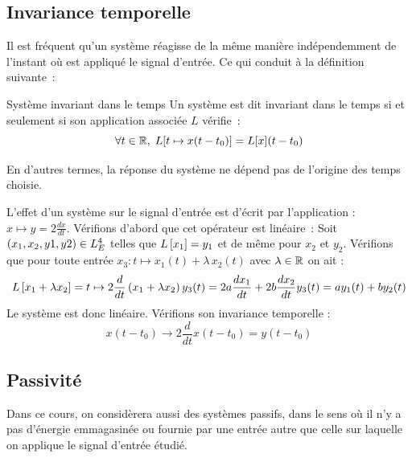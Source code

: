 	
	\subsection{Invariance temporelle}
	Il est fréquent qu'un système réagisse de la même manière indépendemment de l'instant où est appliqué le signal d'entrée. Ce qui conduit à la définition suivante~: 
	\begin{definition}{Système invariant dans le temps}
	Un système est dit invariant dans le temps si et seulement si son application associée $L$ vérifie~:
	\begin{equation}
	\forall t\in \mathbb{R}, \; L[t\mapsto x(t-t_{0})] = L[x](t-t_{0}) 
	\end{equation}
	\end{definition}
	
	En d'autres termes, la réponse du système ne dépend pas de l'origine des temps choisie.
	
	\begin{example}
	L'effet d'un système sur le signal d'entrée est d'écrit par l'application : $x \mapsto y=2\frac{dx}{dt}$.
	Vérifions d'abord que cet opérateur est linéaire~:
	Soit $ \left(x_1,x_2,y1,y2\right)\in L_E^4$ telles que $L\left[x_1\right]=y_1$ et de même pour $x_2$ et $y_2$. Vérifions que pour toute entrée $x_{3} : t\mapsto x_{1}(t)+\lambda\,x_{2}(t) $ avec $\lambda\in\mathbb{R}$ on ait  :
	\begin{eqnarray*}
	L\left[x_1+\lambda x_2\right] = t \mapsto 2\frac{d}{dt}\left(x_1+\lambda x_2\right)
	y_{3}(t)=2a\frac{dx_{1}}{dt}+2b\frac{dx_{2}}{dt}
	y_{3}(t)=ay_{1}(t)+by_{2}(t)
	\end{eqnarray*}
	Le système est donc linéaire. Vérifions son invariance temporelle :
	\begin{equation*}
	x(t-t_{0}) \rightarrow 2\frac{d}{dt}x(t-t_{0})=y(t-t_{0})
	\end{equation*}
	\end{example}
	
	
	\subsection{Passivité}
	Dans ce cours, on considèrera aussi des systèmes passifs, dans le sens où il n'y a pas d'énergie emmagasinée ou fournie par une entrée autre que celle sur laquelle on applique le signal d'entrée étudié.
